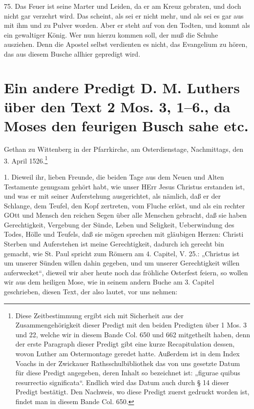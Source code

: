 75. Das Feuer ist seine Marter und Leiden, da er am Kreuz gebraten, und doch nicht gar verzehrt wird. Das scheint, als sei er nicht mehr, und als sei es gar aus mit ihm und zu Pulver worden. Aber er steht auf von den Todten, und kommt als ein gewaltiger König. Wer nun hierzu kommen soll, der muß die Schuhe ausziehen. Denn die Apostel selbst verdienten es nicht, das Evangelium zu hören, das aus diesem Busche allhier gepredigt wird.

\section[Ein andere Predigt über 2 Mos. 3, 1–6]{Ein andere Predigt D. M. Luthers über den Text 2 Mos. 3, 1–6., da Moses den feurigen Busch sahe etc.}

Gethan zu Wittenberg in der Pfarrkirche, am Osterdienstage, Nachmittags, den 3. April 1526.\footnote{Diese Zeitbestimmung ergibt sich mit Sicherheit aus der Zusammengehörigkeit dieser Predigt mit den beiden Predigten über 1 Mos. 3 und 22, welche wir in diesem Bande Col. 650 und 662 mitgetheilt haben, denn der erste Paragraph dieser Predigt gibt eine kurze Recapitulation dessen, wovon Luther am Ostermontage geredet hatte. Außerdem ist in dem Index Voachs in der Zwickauer Rathsschulbibliothek das von uns gesetzte Datum für diese Predigt angegeben, deren Inhalt so bezeichnet ist: „figurae quibus resurrectio significata“. Endlich wird das Datum auch durch § 14 dieser Predigt bestätigt. Den Nachweis, wo diese Predigt zuerst gedruckt worden ist, findet man in diesem Bande Col. 650.}

1. Dieweil ihr, lieben Freunde, die beiden Tage aus dem Neuen und Alten Testamente genugsam gehört habt, wie unser HErr Jesus Christus erstanden ist, und was er mit seiner Auferstehung ausgerichtet, als nämlich, daß er der Schlange, dem Teufel, den Kopf zertreten, vom Fluche erlöst, und als ein rechter GOtt und Mensch den reichen Segen über alle Menschen gebracht, daß sie haben Gerechtigkeit, Vergebung der Sünde, Leben und Seligkeit, Ueberwindung des Todes, Hölle und Teufels, daß sie mögen sprechen mit gläubigen Herzen: Christi Sterben und Auferstehen ist meine Gerechtigkeit, dadurch ich gerecht bin gemacht, wie St. Paul spricht zum Römern am 4. Capitel, V. 25.: „Christus ist um unserer Sünden willen dahin gegeben, und um unserer Gerechtigkeit willen auferwecket“, dieweil wir aber heute noch das fröhliche Osterfest feiern, so wollen wir aus dem heiligen Mose, wie in seinem andern Buche am 3. Capitel geschrieben, diesen Text, der also lautet, vor uns nehmen:

